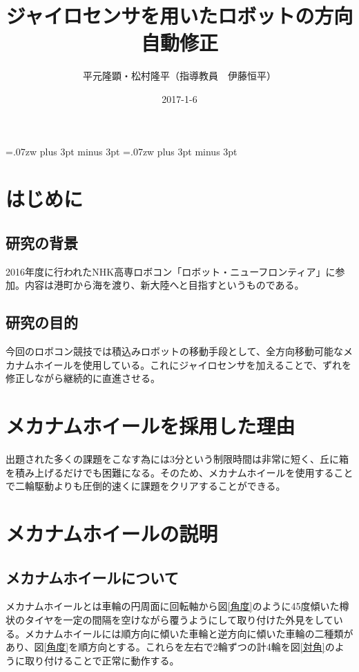 \documentclass[twocolumn,11pt]{sotsuken_abst}
\title{ジャイロセンサを用いたロボットの方向自動修正}
\author{平元隆顕・松村隆平（指導教員　伊藤恒平）}
\date{2017-1-6}
\begin{document}
\maketitle
\thispagestyle{fancy}
\pagestyle{fancy}

\setlength{\baselineskip}{5.6truemm}

\kanjiskip=.07zw plus 3pt minus 3pt
\xkanjiskip=.07zw plus 3pt minus 3pt


\section{はじめに}

	\subsection{研究の背景}
	2016年度に行われたNHK高専ロボコン「ロボット・ニューフロンティア」に参加。内容は港町から海を渡り、新大陸へと目指すというものである。

	\subsection{研究の目的}
	今回のロボコン競技では積込みロボットの移動手段として、全方向移動可能なメカナムホイールを使用している。これにジャイロセンサを加えることで、ずれを修正しながら継続的に直進させる。

\section{メカナムホイールを採用した理由}
	出題された多くの課題をこなす為には3分という制限時間は非常に短く、丘に箱を積み上げるだけでも困難になる。そのため、メカナムホイールを使用することで二輪駆動よりも圧倒的速くに課題をクリアすることができる。

\section{メカナムホイールの説明}

	\subsection{メカナムホイールについて}
	メカナムホイールとは車輪の円周面に回転軸から図\ref{角度}のように45度傾いた樽状のタイヤを一定の間隔を空けながら覆うようにして取り付けた外見をしている。メカナムホイールには順方向に傾いた車輪と逆方向に傾いた車輪の二種類があり、図\ref{角度}を順方向とする。これらを左右で2輪ずつの計4輪を図\ref{対角}のように取り付けることで正常に動作する。
\end{document}
